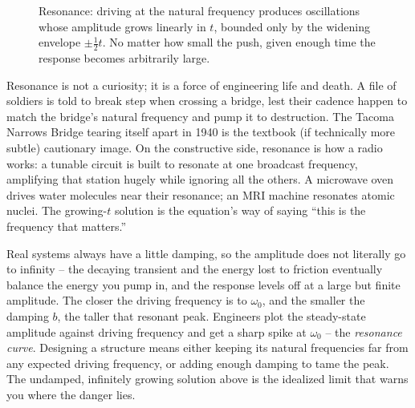 \begin{figure}[H]
\centering
{}
\caption{Resonance: driving at the natural frequency produces oscillations whose
amplitude grows linearly in $t$, bounded only by the widening envelope $\pm
\tfrac12 t$. No matter how small the push, given enough time the response becomes
arbitrarily large.}
\label{ch38:fig-resonance}
\end{figure}

\begin{historybox}
Resonance is not a curiosity; it is a force of engineering life and death. A file
of soldiers is told to break step when crossing a bridge, lest their cadence
happen to match the bridge's natural frequency and pump it to destruction. The
Tacoma Narrows Bridge tearing itself apart in 1940 is the textbook (if
technically more subtle) cautionary image. On the constructive side, resonance is
how a radio works: a tunable circuit is built to resonate at one broadcast
frequency, amplifying that station hugely while ignoring all the others. A
microwave oven drives water molecules near their resonance; an MRI machine
resonates atomic nuclei. The growing-$t$ solution is the equation's way of saying
``this is the frequency that matters.''
\end{historybox}

\begin{applicationbox}
Real systems always have a little damping, so the amplitude does not literally go
to infinity -- the decaying transient and the energy lost to friction eventually
balance the energy you pump in, and the response levels off at a large but finite
amplitude. The closer the driving frequency is to $\omega_0$, and the smaller the
damping $b$, the taller that resonant peak. Engineers plot the steady-state
amplitude against driving frequency and get a sharp spike at $\omega_0$ -- the
\emph{resonance curve}. Designing a structure means either keeping its natural
frequencies far from any expected driving frequency, or adding enough damping to
tame the peak. The undamped, infinitely growing solution above is the idealized
limit that warns you where the danger lies.
\end{applicationbox}

